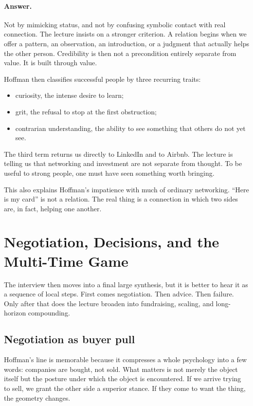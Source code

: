 \paragraph{Answer.}
Not by mimicking status, and not by confusing symbolic contact with real connection. The lecture insists on a stronger criterion. A relation begins when we offer a pattern, an observation, an introduction, or a judgment that actually helps the other person. Credibility is then not a precondition entirely separate from value. It is built through value.

Hoffman then classifies successful people by three recurring traits:
\begin{itemize}
\item curiosity, the intense desire to learn;
\item grit, the refusal to stop at the first obstruction;
\item contrarian understanding, the ability to see something that others do not yet see.
\end{itemize}
The third term returns us directly to LinkedIn and to Airbnb. The lecture is telling us that networking and investment are not separate from thought. To be useful to strong people, one must have seen something worth bringing.

This also explains Hoffman's impatience with much of ordinary networking. ``Here is my card'' is not a relation. The real thing is a connection in which two sides are, in fact, helping one another.

\section{Negotiation, Decisions, and the Multi-Time Game}

The interview then moves into a final large synthesis, but it is better to hear it as a sequence of local steps. First comes negotiation. Then advice. Then failure. Only after that does the lecture broaden into fundraising, scaling, and long-horizon compounding.

\subsection{Negotiation as buyer pull}

Hoffman's line is memorable because it compresses a whole psychology into a few words: companies are bought, not sold. What matters is not merely the object itself but the posture under which the object is encountered. If we arrive trying to sell, we grant the other side a superior stance. If they come to want the thing, the geometry changes.

